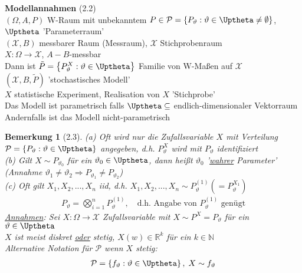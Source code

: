 \documentclass[a4paper,openany]{book}
\theoremstyle{mytheoremstyle}
\newtheorem*{bem}{Bemerkung}
\theoremstyle{mytheoremstyle2}
\begin{document}
\noindent\textbf{Modellannahmen} (2.2) \\
$(\Omega ,A,P)$ W-Raum mit unbekanntem $P \in \mathcal{P}=\left\{P_{\vartheta}:\vartheta \in \Uptheta \neq \emptyset \right\}$, $\Uptheta$ 'Parameterraum' \\
$(\mathcal{X},B)$ messbarer Raum (Messraum), $\mathcal{X}$ Stichprobenraum \\
$X:\Omega \to \mathcal{X}$, $A-B$-messbar  \\
Dann ist $\tilde{P}=\left\{P_{\vartheta}^X:\vartheta \in \Uptheta\right\}$ Familie von W-Maßen auf $\mathcal{X}$ \\
$(\mathcal{X},B,\tilde{P})$ 'stochastisches Modell' \\
$X$ statistische Experiment, Realisation von $X$ 'Stichprobe' \\
Das Modell ist parametrisch falls $\Uptheta \subseteq $ endlich-dimensionaler Vektorraum \\
Andernfalls ist das Modell nicht-parametrisch
\begin{bem}[2.3]
  (a) Oft wird nur die Zufallsvariable $X$ mit Verteilung $\mathcal{P}=\left\{P_{\vartheta}:\vartheta \in \Uptheta\right\}$ angegeben, d.h. $P_{\vartheta}^X$ wird mit $P_{\vartheta}$ identifiziert \\
  (b) Gilt $X\sim P_{\vartheta_0}$ für ein $\vartheta_0 \in \Uptheta$, dann heißt $\vartheta_0$ '\underline{wahrer} Parameter' (Annahme $\vartheta_1 \neq \vartheta_2 \Rightarrow P_{\vartheta_1}\neq P_{\vartheta_2}$) \\
  (c) Oft gilt $X_1,X_2,...,X_n$ iid, d.h. $X_1,X_2,...,X_n \sim P_{\vartheta}^{(1)}(=P_{\vartheta}^{X_1})$  
  \begin{align*}
    P_{\vartheta}=\bigotimes_{i=1}^{n}P_{\vartheta}^{(1)}, \quad \text{d.h. Angabe von } P_{\vartheta}^{(1)}\text{ genügt}
  \end{align*}
  \underline{Annahmen}: Sei $X:\Omega \to \mathcal{X}$ Zufallsvariable mit $X\sim P^X=P _{\vartheta}$ für ein $\vartheta \in \Uptheta$    \\
  $X$ ist meist diskret \underline{oder} stetig, $X(w)\in \mathbb{R}^k$ für ein $k \in \mathbb{N}$   \\
  Alternative Notation für $\mathcal{P}$ wenn $X$ stetig:
  \begin{align*}
    \mathcal{P}=\left\{f_{\vartheta}:\vartheta \in \Uptheta\right\}, \; X\sim f_{\vartheta}
  \end{align*}
\end{bem}
\end{document}
